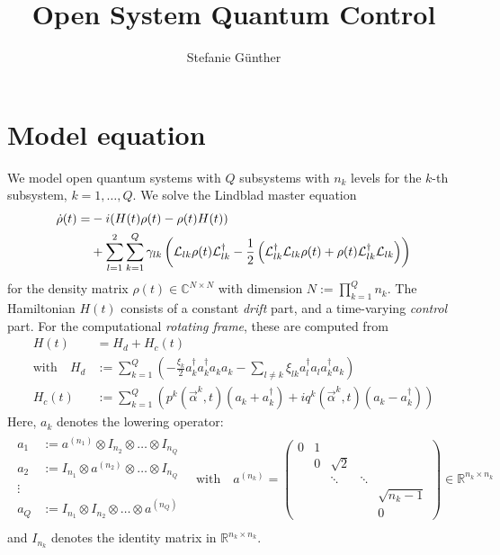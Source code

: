\documentclass[letterpaper]{article}
\title{Open System Quantum Control}
\author{Stefanie G{\"u}nther}
\newcommand{\Ell}{\mathcal{L}}
\newcommand{\R}{\mathds{R}}
\newcommand{\C}{\mathds{C}}
\begin{document}
\maketitle

\section{Model equation}
We model open quantum systems with $Q$ subsystems with $n_k$ levels for the $k$-th subsystem, $k=1,\dots,Q$. We solve the Lindblad master equation
\begin{align}\label{mastereq}
  \dot \rho(t) = &-i(H(t)\rho(t) - \rho(t)H(t)) \notag \\
          &+ \sum_{l=1}^2 \sum_{k=1}^Q \gamma_{lk} \left( \Ell_{lk} \rho(t) \Ell_{lk}^{\dagger} - \frac 1 2 \left( \Ell_{lk}^{\dagger}\Ell_{lk} \rho(t) + \rho(t)\Ell_{lk}^{\dagger} \Ell_{lk}\right) \right)
\end{align}
for the density matrix $\rho(t)\in \C^{N\times N}$ with dimension $N := \prod_{k=1}^Q n_k$. The Hamiltonian $H(t)$ consists of a constant \textit{drift} part, and a time-varying \textit{control} part. For the computational \textit{rotating frame}, these are computed from
\begin{align}
  H(t) &= H_d + H_c(t) \\
  \text{with} \quad H_d &:= \sum_{k=1}^Q \left(- \frac{\xi_k}{2} a_k^{\dagger}a_k^{\dagger}a_k a_k - \sum_{l\neq k} \xi_{lk} a_l^{\dagger}a_l a_k^{\dagger} a_k  \right) \\
                 H_c(t) &:= \sum_{k=1}^Q \left( p^k(\vec{\alpha}^k,t) (a_k + a_k^{\dagger}) + i q^k(\vec{\alpha}^k,t)(a_k - a_k^{\dagger})  \right)
\end{align}
Here, $a_k$ denotes the lowering operator:
\begin{align}
  \begin{array}{rl}
  a_1 &:= a^{(n_1)} \otimes I_{n_2} \otimes \dots \otimes I_{n_Q}\\
  a_2 &:= I_{n_1} \otimes a^{(n_2)} \otimes \dots \otimes I_{n_Q}\\
  \vdots \, & \\
  a_Q &:= I_{n_1} \otimes I_{n_2} \otimes \dots \otimes a^{(n_Q)}\\
  \end{array}
  \quad \text{with}\quad
 a^{(n_k)} = \begin{pmatrix}
   0 & 1 &          &         &    \\
     & 0 & \sqrt{2} &         &     \\
     &   & \ddots   & \ddots  &    \\
     &   &          &         & \sqrt{n_k-1}  \\
     &   &          &         & 0   
 \end{pmatrix} \in \R^{n_k \times n_k}
\end{align}
and $I_{n_k}$ denotes the identity matrix in $\R^{n_k \times n_k}$.
\end{document}
